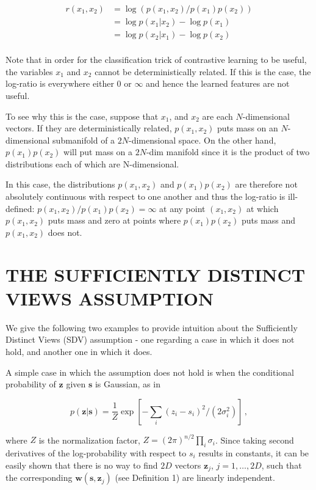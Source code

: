 \documentclass[letterpaper]{article}
\theoremstyle{definition}
\begin{document}
\begin{align*}
    r(x_1, x_2) &= \log \left( p(x_1, x_2) / p(x_1) p(x_2)\right) \\
    &= \log p(x_1 | x_2)  - \log p(x_1) \\
    &= \log p(x_2 | x_1)  - \log p(x_2) \\
\end{align*}

Note that in order for the classification trick of contrastive learning to be useful, the variables $x_1$ and $x_2$ cannot be deterministically related.
If this is the case, the log-ratio is everywhere either $0$ or $\infty$ and hence the learned features are not useful.

To see why this is the case, suppose that $x_1$, and $x_2$ are each $N$-dimensional vectors.
If they are deterministically related, $p(x_1, x_2)$ puts mass on an $N$-dimensional submanifold of a $2N$-dimensional space.
On the other hand, $p(x_1)p(x_2)$ will put mass on a $2N$-dim manifold since it is the product of two distributions each of which are N-dimensional.

In this case, the distributions $p(x_1, x_2)$ and $p(x_1)p(x_2)$ are therefore not absolutely continuous with respect to one another and thus the log-ratio is ill-defined: $p(x_1, x_2)/p(x_1)p(x_2) = \infty$ at any point $(x_1,x_2)$ at which $p(x_1, x_2)$ puts mass and zero at points where $p(x_1)p(x_2)$ puts mass and $p(x_1,x_2)$ does not.


\section{THE SUFFICIENTLY DISTINCT VIEWS ASSUMPTION}
\label{appendix:sdv}

We give the following two examples to provide intuition about the Sufficiently Distinct Views (SDV) assumption - one regarding a case in which it does not hold, and another one in which it does.


A simple case in which the assumption does not hold is when the conditional probability of $\bm{z}$ given $\bm{s}$ is Gaussian, as in

\begin{equation}
p(\bm{z}|\bm{s}) = \frac{1}{Z} \exp\left[ -\sum_i (z_i - s_i)^2/(2\sigma_i^2) \right]\,, \label{eq:unsatisfied}
\end{equation}

where $Z$ is the normalization factor, $Z = (2\pi)^{n/2}  \prod_i \sigma_i$.
Since taking second derivatives of the log-probability with respect to $s_i$ results in constants,
it can be easily shown that there is no way to find $2D$ vectors $\bm{z}_j$, $j=1, \ldots, 2D$, such that the corresponding $\bm{w}(\bm{s}, \bm{z}_j)$ (see Definition 1) are linearly independent.
\end{document}
